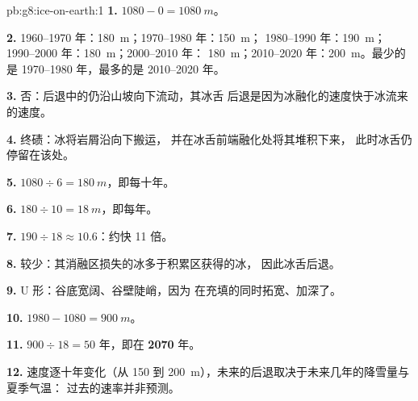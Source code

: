 \begin{solution}{pb:g8:ice-on-earth:1}
\textbf{1.} $1080 - 0 = \qty{1080}{m}$。

\textbf{2.} 1960--1970 年：\qty{180}{m}；1970--1980 年：\qty{150}{m}；
1980--1990 年：\qty{190}{m}；1990--2000 年：\qty{180}{m}；2000--2010 年：
\qty{180}{m}；2010--2020 年：\qty{200}{m}。最少的是 1970--1980 年，最多的是
2010--2020 年。

\textbf{3.} 否：后退中的仍沿山坡向下流动，其冰舌
后退是因为冰融化的速度快于冰流来的速度。

\textbf{4.} 终碛：冰将岩屑沿向下搬运，
并在冰舌前端融化处将其堆积下来，
此时冰舌仍停留在该处。

\textbf{5.} $1080 \div 6 = \qty{180}{m}$，即每十年。

\textbf{6.} $180 \div 10 = \qty{18}{m}$，即每年。

\textbf{7.} $190 \div 18 \approx 10.6$：约快 11 倍。

\textbf{8.} 较少：其消融区损失的冰多于积累区获得的冰，
因此冰舌后退。

\textbf{9.} U 形：谷底宽阔、谷壁陡峭，因为
在充填的同时拓宽、加深了。

\textbf{10.} $1980 - 1080 = \qty{900}{m}$。

\textbf{11.} $900 \div 18 = 50$ 年，即在 \textbf{2070} 年。

\textbf{12.} 速度逐十年变化（从 150
到 \qty{200}{m}），未来的后退取决于未来几年的降雪量与夏季气温：
过去的速率并非预测。
\end{solution}
